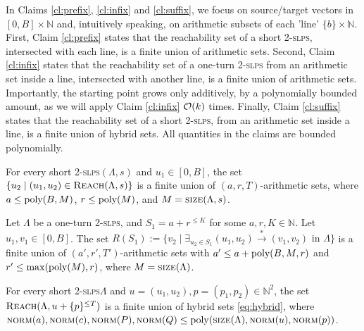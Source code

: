 \documentclass[a4paper, UKenglish, cleveref, autoref, thm-restate]{lipics-v2021}
\newcommand{\N}{\mathbb{N}}
\newcommand{\set}[1]{\{#1\}}
\newcommand{\reach}{\textsc{Reach}}
\newcommand{\trans}[1]{\stackrel{#1}{\longrightarrow}}
\newcommand{\tran}{\trans{*}}
\newcommand{\slps}{\textsc{slps}\xspace}
\newcommand{\norm}{\textsc{norm}}
\newcommand{\size}{\textsc{size}}
\newcommand{\poly}{\textup{poly}}
\newcommand{\OO}{{\cal O}}
\newcommand{\dslps}{2-\slps}
\newcommand{\setfromto}[2]{[#1, #2]}
\begin{document}
\begin{appendixproof}
In Claims \ref{cl:prefix}, \ref{cl:infix} and \ref{cl:suffix}, we focus on source/target vectors
in $\setfromto 0 B \times \N$ and, intuitively speaking, on arithmetic subsets of each 'line' $\{b\}\times \N$.
First, Claim \ref{cl:prefix} states that the reachability set of a short \dslps, intersected with each line,
is a finite union of arithmetic sets.
Second, Claim \ref{cl:infix} states that the reachability set of a one-turn \dslps from 
an arithmetic set inside a line, intersected with another line, is a finite union of arithmetic sets.
Importantly, the starting point grows only additively, by a polynomially bounded amount, 
as we will apply Claim \ref{cl:infix} $\OO(k)$ times.
Finally, Claim \ref{cl:suffix} states that the reachability set of a short \dslps, from an arithmetic set
inside a line, is a finite union of hybrid sets.
All quantities in the claims are bounded polynomially.

\begin{claim}\label{cl:prefix}
For every short \dslps $(\Lambda,s)$ 
and $u_1 \in [0,B]$,
the set $\{u_2 \mid (u_1, u_2) \in \reach(\Lambda,s)\}$ is a finite union of $(a, r, T)$-arithmetic sets, where
$a \leq \poly(B,M)$, $r \leq \poly(M)$, and $M=\size(\Lambda,s)$.
\end{claim}
\begin{claim}\label{cl:infix}
Let $\Lambda$ be a one-turn \dslps,
and $S_1 = a + r^{\leq K}$ for some $a, r, K \in \N$.
Let $u_1, v_1 \in [0, B]$.
The set $R(S_1) := \{v_2 \mid \exists_{u_2 \in S_1} (u_1, u_2) \tran (v_1, v_2) \text{ in } \Lambda\}$
is a finite union of $(a', r', T')$-arithmetic sets with
$a' \leq a + \poly(B,M,r)$ and $r' \leq \max(\poly(M),r)$, where $M=\size(\Lambda)$.
\end{claim}

\begin{claim}\label{cl:suffix}
For every short \dslps $\Lambda$ and $u= (u_1, u_2), p = (p_1, p_2)\in\N^2$, 
the set $\reach(\Lambda, u + \set{p}^{\leq T})$
is a finite union of hybrid sets \eqref{eq:hybrid},
where $\norm(a), \norm(c), \norm(P), \norm(Q) \leq \poly(\size(\Lambda), \norm(u),\norm(p))$.
\end{claim}


\end{appendixproof}
\end{document}

